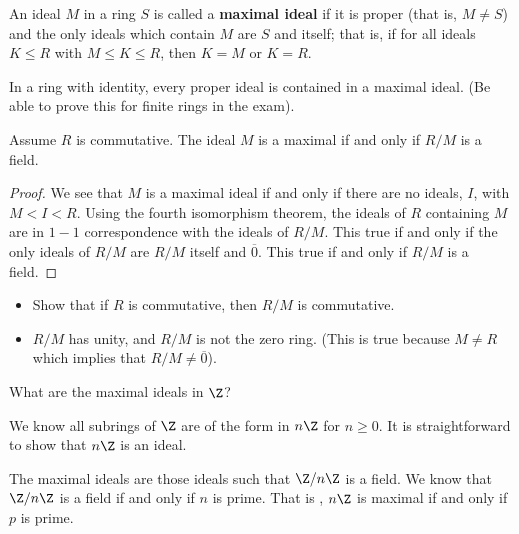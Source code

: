 \begin{definition}
    An ideal \( M  \) in a ring \( S  \) is called a \textbf{maximal ideal} if it is proper (that is, \( M \neq S  \)) and the only ideals which contain \( M  \) are \( S  \) and itself; that is, if for all ideals \( K \leq R  \) with \( M \leq K \leq R  \), then \( K = M  \) or \( K = R  \).
\end{definition}

\begin{prop}
   In a ring with identity, every proper ideal is contained in a maximal ideal. (Be able to prove this for finite rings in the exam). 
\end{prop}

\begin{prop}
    Assume \( R  \) is commutative. The ideal \( M  \) is a maximal if and only if \( R / M  \) is a field.
\end{prop}
\begin{proof}
We see that \( M  \) is a maximal ideal if and only if there are no ideals, \( I  \), with \( M < I < R \). Using the fourth isomorphism theorem, the ideals of \( R  \) containing \( M  \) are in \( 1-1 \) correspondence with the ideals of \( R /M  \). This true if and only if the only ideals of \( R /M  \) are \( R /M  \) itself and \( \overline{0}  \). This true if and only if \( R / M  \) is a field.  
\end{proof}
\begin{remark}
\begin{itemize}
    \item Show that if \( R   \) is commutative, then \( R / M  \) is commutative.
    \item \( R /M  \) has unity, and \( R /M  \) is not the zero ring. (This is true because \( M \neq R  \) which implies that \( R /M \neq \overline{0} \)).
\end{itemize}
\end{remark}

\begin{eg}
   What are the maximal ideals in \( \Z  \)?

   We know all subrings of \( \Z  \) are of the form in \( n\Z  \) for \( n \geq 0  \). It is straightforward to show that \( n \Z  \) is an ideal. 

   The maximal ideals are those ideals such that \( \Z / n \Z  \) is a field. We know that \( \Z / n \Z \) is a field if and only if \( n  \) is prime. That is , \( n \Z  \) is maximal if and only if \( p  \) is prime.
\end{eg}

